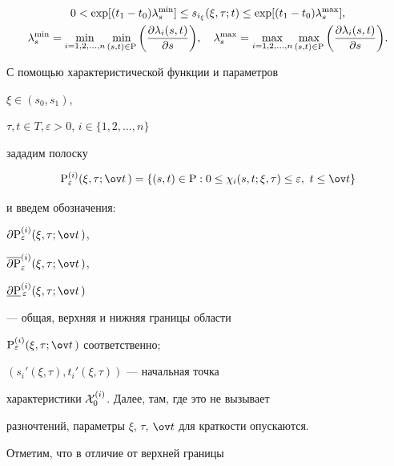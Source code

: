 \begin{gather}


0 < \exp [ (t_1 - t_0) \lambda_{s}^{\min} ] \leq


s_{i_\xi}(\xi, \tau; t) \leq


\exp [ (t_1 - t_0) \lambda_{s}^{\max} ], \\


%


\lambda_{s}^{\min} = \min_{i=1,2,\dotsc,n} \min_{(s,t) \in \P}


\bigg( \frac{\partial\lambda_{i}(s,t)}{\partial s} \bigg), \quad


\lambda_{s}^{\max} = \max_{i=1,2,\dotsc,n} \max_{(s,t) \in \P}


\bigg( \frac{\partial\lambda_{i}(s,t)}{\partial s} \bigg).\notag


\end{gather}





С помощью характеристической функции и параметров


$\xi \in (s_0, s_1)$,


$\tau, t \in T, \varepsilon > 0$, $i \in \{ 1,2,\dotsc,n \}$


зададим полоску


$$


\P_{\varepsilon}^{(i)}(\xi, \tau; \ov t\,) = \{ (s,t) \in {\P}:


0 \leq \chi_{i}(s,t; \xi, \tau) \leq \varepsilon, \ t \leq \ov t \}


$$


и введем обозначения:


$\partial {\P}_{\varepsilon}^{(i)}(\xi, \tau; \ov t\,)$,


$\overline{\partial {\P}}_{\varepsilon}^{(i)}(\xi, \tau; \ov t\,)$,


$\underline{\partial {\P}}{}_{\,\varepsilon}^{(i)}(\xi, \tau; \ov t\,)$


--- общая, верхняя и нижняя границы области


${\P}_{\varepsilon}^{(i)}(\xi, \tau; \ov t\,)$ соответственно;


$(s_{i}'(\xi, \tau), t_{i}'(\xi, \tau))$ --- начальная точка


характеристики ${\cal X}_{0}^{(i)}$. Далее, там, где это не вызывает


разночтений, параметры $\xi$, $\tau$, $\ov t$ для краткости опускаются.


Отметим, что в отличие от верхней границы


